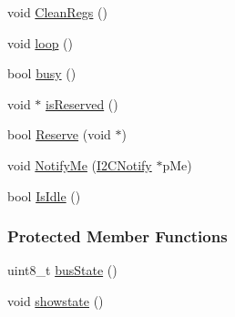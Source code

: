 \begin{DoxyCompactItemize}
\item 
void \hyperlink{class_i2_c___master_ab07f8cb8925c82e8d7c415fb92db676d}{CleanRegs} ()
\item 
void \hyperlink{class_i2_c___master_af4d34826036a7c9f3ed040d65997f180}{loop} ()
\item 
bool \hyperlink{class_i2_c___master_aa8b792984d9e4f42da45f38dbb6e8941}{busy} ()
\item 
void $\ast$ \hyperlink{class_i2_c___master_ac936aed1f6ee0db15a8849a2b70588ca}{isReserved} ()
\item 
bool \hyperlink{class_i2_c___master_a0ef6ebd851b05a8dc8e75fa3b349c09b}{Reserve} (void $\ast$)
\item 
void \hyperlink{class_i2_c___master_a608731d8ae2cf3c9141dd4579f74d5f7}{NotifyMe} (\hyperlink{class_i2_c_notify}{I2CNotify} $\ast$pMe)
\item 
bool \hyperlink{class_i2_c___master_ab27a4ec0eef7f5ad2115077e4252470e}{IsIdle} ()
\end{DoxyCompactItemize}
\subsubsection*{Protected Member Functions}
\begin{DoxyCompactItemize}
\item 
uint8\_\-t \hyperlink{class_i2_c___master_a386c969250428002f3aeaffeb6933b13}{busState} ()
\item 
void \hyperlink{class_i2_c___master_a50b47d3c18d7aaa0602df3833c6a299e}{showstate} ()
\end{DoxyCompactItemize}
